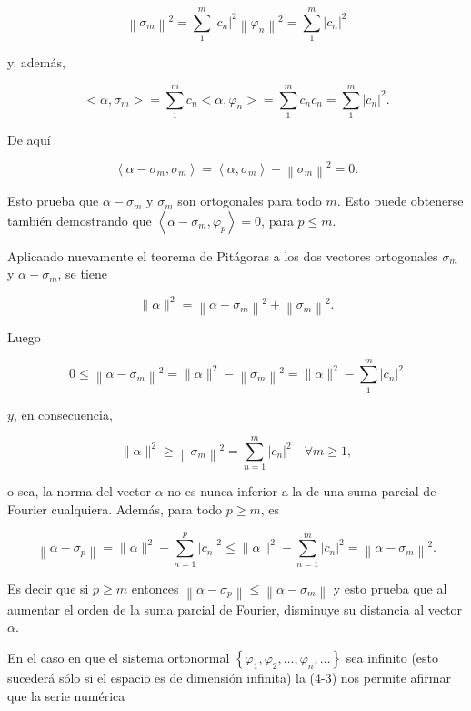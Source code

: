 \documentclass[10pt]{article}
\theoremstyle{plain}
\theoremstyle{definition}
\theoremstyle{remark}
\begin{document}
$$
\left\|\sigma_{m}\right\|^{2}=\sum_{1}^{m}\left|c_{n}\right|^{2}\left\|\varphi_{n}\right\|^{2}=\sum_{1}^{m}\left|c_{n}\right|^{2}
$$

y, además,

$$
<\alpha, \sigma_{m}>=\sum_{1}^{m} \overline{c_{n}}<\alpha, \varphi_{n}>=\sum_{1}^{m} \bar{c}_{n} c_{n}=\sum_{1}^{m}\left|c_{n}\right|^{2} .
$$

De aquí

$$
\left\langle\alpha-\sigma_{m}, \sigma_{m}\right\rangle=\left\langle\alpha, \sigma_{m}\right\rangle-\left\|\sigma_{m}\right\|^{2}=0 .
$$

Esto prueba que $\alpha-\sigma_{m}$ y $\sigma_{m}$ son ortogonales para todo $m$. Esto puede obtenerse también demostrando que $\left\langle\alpha-\sigma_{m}, \varphi_{p}\right\rangle=0$, para $p \leqslant m$.

Aplicando nuevamente el teorema de Pitágoras a los dos vectores ortogonales $\sigma_{m}$ y $\alpha-\sigma_{m}$, se tiene

$$
\|\alpha\|^{2}=\left\|\alpha-\sigma_{m}\right\|^{2}+\left\|\sigma_{m}\right\|^{2} .
$$

Luego


\begin{equation*}
0 \leqslant\left\|\alpha-\sigma_{m}\right\|^{2}=\|\alpha\|^{2}-\left\|\sigma_{m}\right\|^{2}=\|\alpha\|^{2}-\sum_{1}^{m}\left|c_{n}\right|^{2} \tag{4-2}
\end{equation*}


$y$, en consecuencia,


\begin{equation*}
\|\alpha\|^{2} \geqslant\left\|\sigma_{m}\right\|^{2}=\sum_{n=1}^{m}\left|c_{n}\right|^{2} \quad \forall m \geqslant 1, \tag{4-3}
\end{equation*}


o sea, la norma del vector $\alpha$ no es nunca inferior a la de una suma parcial de Fourier cualquiera. Además, para todo $p \geqslant m$, es

$$
\left\|\alpha-\sigma_{p}\right\|=\|\alpha\|^{2}-\sum_{n=1}^{p}\left|c_{n}\right|^{2} \leqslant\|\alpha\|^{2}-\sum_{n=1}^{m}\left|c_{n}\right|^{2}=\left\|\alpha-\sigma_{m}\right\|^{2} .
$$

Es decir que si $p \geqslant m$ entonces $\left\|\alpha-\sigma_{p}\right\| \leqslant\left\|\alpha-\sigma_{m}\right\|$ y esto prueba que al aumentar el orden de la suma parcial de Fourier, disminuye su distancia al vector $\alpha$.

En el caso en que el sistema ortonormal $\left\{\varphi_{1}, \varphi_{2}, \ldots, \varphi_{n}, \ldots\right\}$ sea infinito (esto sucederá sólo si el espacio es de dimensión infinita) la (4-3) nos permite afirmar que la serie numérica
\end{document}
